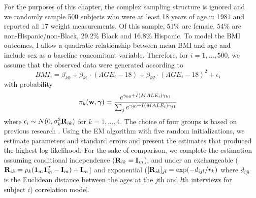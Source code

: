For the purposes of this chapter, the complex sampling structure is ignored and we randomly sample 500 subjects who were at least 18 years of age in 1981 and reported all 17 weight measurements. Of this sample, 51\% are female, 54\% are non-Hispanic/non-Black, 29.2\% Black and 16.8\% Hispanic. To model the BMI outcomes, I allow a quadratic relationship between mean BMI and age and include sex as a baseline concomitant variable. Therefore, for $i=1,...,500$, we assume that the observed data were generated according to
$$BMI_{i}=\beta_{k0}+\beta_{k1}\cdot (AGE_{i}-18)+\beta_{k2}\cdot (AGE_{i}-18)^{2}+\epsilon_{i}$$
with probability
$$\pi_{k}(\mathbf w,\boldsymbol\gamma)=\frac{e^{\gamma_{k0}+I(MALE_{i})\gamma_{k1}}}{\sum_{j}e^{\gamma_{j0}+I(MALE_{i})\gamma_{j1}}}$$
where $\epsilon_{i}\sim N(0,\sigma_{k}^{2}\mathbf R_{ik})$
for $k=1,...,4$. The choice of four groups is based on previous research \cite{ostbye2011}. Using the EM algorithm with five random initializations, we estimate parameters and standard errors and present the estimates that produced the highest log-likelihood. For the sake of comparison, we complete the estimation assuming conditional independence ($\mathbf R_{ik}  = \mathbf I_m$), and under an exchangeable ($\mathbf R_{ik} = \rho_k(\mathbf 1_m\mathbf 1_{m}^{T} - \mathbf I_m)+\mathbf I_m$) and exponential ($[\mathbf R_{ik}]_{jl} = \exp(-d_{ijl}/r_k)$ where $d_{ijl}$ is the Euclidean distance between the ages at the $j$th and $l$th interviews for subject $i$) correlation model.
